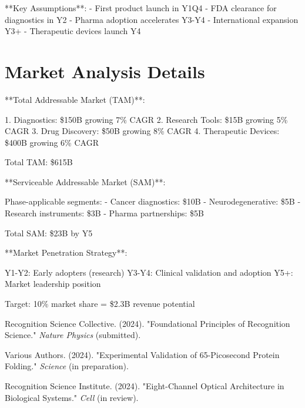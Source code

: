 \documentclass[12pt,a4paper]{report}
\begin{document}
**Key Assumptions**:
- First product launch in Y1Q4
- FDA clearance for diagnostics in Y2
- Pharma adoption accelerates Y3-Y4
- International expansion Y3+
- Therapeutic devices launch Y4

\section{Market Analysis Details}

**Total Addressable Market (TAM)**:

1. Diagnostics: \$150B growing 7\% CAGR
2. Research Tools: \$15B growing 5\% CAGR
3. Drug Discovery: \$50B growing 8\% CAGR
4. Therapeutic Devices: \$400B growing 6\% CAGR

Total TAM: \$615B

**Serviceable Addressable Market (SAM)**:

Phase-applicable segments:
- Cancer diagnostics: \$10B
- Neurodegenerative: \$5B
- Research instruments: \$3B
- Pharma partnerships: \$5B

Total SAM: \$23B by Y5

**Market Penetration Strategy**:

Y1-Y2: Early adopters (research)
Y3-Y4: Clinical validation and adoption
Y5+: Market leadership position

Target: 10\% market share = \$2.3B revenue potential

\begin{thebibliography}{99}

 Recognition Science Collective. (2024). "Foundational Principles of Recognition Science." \textit{Nature Physics} (submitted).

 Various Authors. (2024). "Experimental Validation of 65-Picosecond Protein Folding." \textit{Science} (in preparation).

 Recognition Science Institute. (2024). "Eight-Channel Optical Architecture in Biological Systems." \textit{Cell} (in review).

\end{thebibliography}
\end{document}
